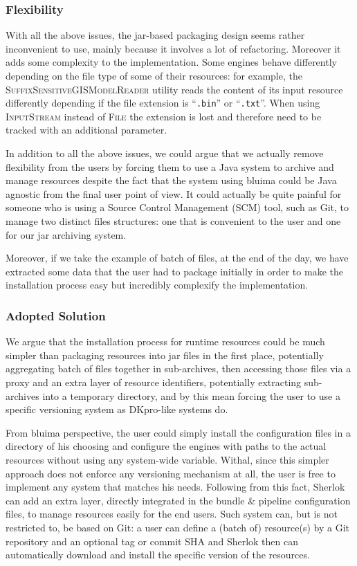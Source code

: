 \documentclass{article}
\newcommand{\ID}[1]{{\textsc{#1}}}
\newcommand{\PATH}[1]{\mbox{\texttt{#1}}}
\begin{document}
\subsubsection{Flexibility}

With all the above issues, the jar-based packaging design seems rather inconvenient to use, mainly
because it involves a lot of refactoring. Moreover it adds some complexity to the implementation.
Some engines behave differently depending on the file type of some of their resources: for example,
the \ID{SuffixSensitiveGISModelReader} utility reads the content of its input resource differently
depending if the file extension is ``\PATH{.bin}'' or ``\PATH{.txt}''. When using \ID{InputStream}
instead of \ID{File} the extension is lost and therefore need to be tracked with an additional
parameter.

In addition to all the above issues, we could argue that we actually remove flexibility from the
users by forcing them to use a Java system to archive and manage resources despite the fact that the
system using bluima could be Java agnostic from the final user point of view. It could actually be
quite painful for someone who is using a Source Control Management (SCM) tool, such as Git, to
manage two distinct files structures: one that is convenient to the user and one for our jar
archiving system.

Moreover, if we take the example of batch of files, at the end of the day, we have extracted some
data that the user had to package initially in order to make the installation process easy but
incredibly complexify the implementation.


\subsubsection{Adopted Solution}

We argue that the installation process for runtime resources could be much simpler than packaging
resources into jar files in the first place, potentially aggregating batch of files together in
sub-archives, then accessing those files via a proxy and an extra layer of resource identifiers,
potentially extracting sub-archives into a temporary directory, and by this mean forcing the user to
use a specific versioning system as DKpro-like systems do.

From bluima perspective, the user could simply install the configuration files in a directory of his
choosing and configure the engines with paths to the actual resources without using any system-wide
variable. Withal, since this simpler approach does not enforce any versioning mechanism at all, the
user is free to implement any system that matches his needs. Following from this fact, Sherlok can
add an extra layer, directly integrated in the bundle \& pipeline configuration files, to manage
resources easily for the end users. Such system can, but is not restricted to, be based on Git: a
user can define a (batch of) resource(s) by a Git repository and an optional tag or commit SHA and
Sherlok then can automatically download and install the specific version of the resources.
\end{document}
